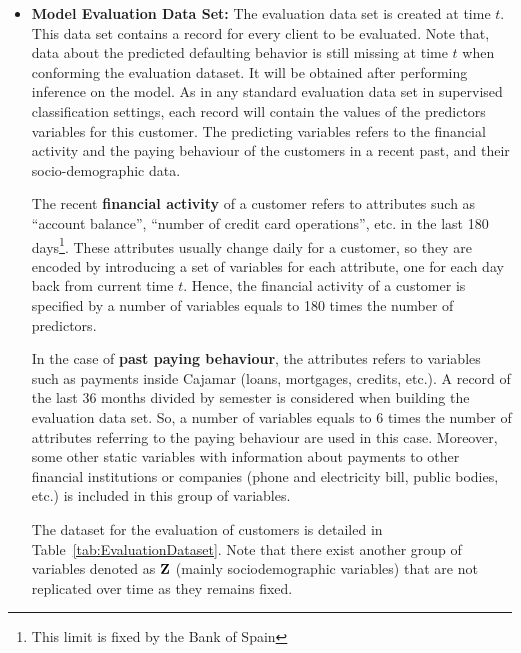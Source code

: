\begin{itemize}
\item \textbf{Model Evaluation Data Set:} The evaluation data set is created at time $t$. This data set contains a record for every client to be evaluated. Note that, data about the predicted defaulting behavior is still missing at time $t$ when conforming the evaluation dataset. It will be obtained after performing inference on the model. As in any standard evaluation data set in supervised classification settings, each record will contain the values of the predictors variables for this customer. The predicting variables refers to the financial activity and the paying behaviour of the customers in a recent past, and their socio-demographic data. 

The recent {\bf financial activity} of a customer refers to attributes such as ``account balance'', ``number of credit card operations'', etc. in the last 180 days\footnote{This limit is fixed by the Bank of Spain}. These attributes usually change daily for a customer, so they are encoded by introducing a set of variables for each attribute, one for each day back from current time $t$. Hence, the financial activity of a customer is specified by a number of variables equals to 180 times the number of predictors. 

In the case of {\bf past paying behaviour}, the attributes refers to variables such as payments inside Cajamar (loans, mortgages, credits, etc.). A record of the last 36 months divided by semester is considered when building the evaluation data set. So, a number of variables equals to $6$ times the number of attributes referring to the paying behaviour are used in this case. Moreover, some other static variables with information about payments to other financial institutions or companies (phone and electricity bill, public bodies, etc.) is included in this group of variables.

The dataset for the evaluation of customers is detailed in Table~\ref{tab:EvaluationDataset}. Note that there exist another group of variables denoted as $\mathbf{Z}$ (mainly sociodemographic variables) that are not replicated over time as they remains fixed. 



\end{itemize}
